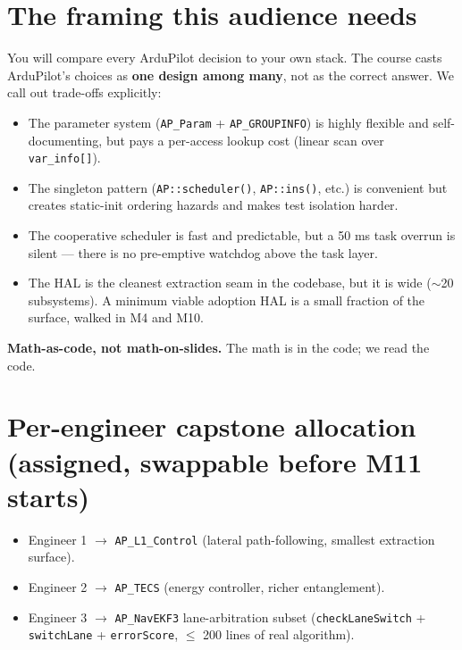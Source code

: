 \documentclass[a4paper,11pt,twoside]{article}
\begin{document}
\section*{The framing this audience needs}

You will compare every ArduPilot decision to your own stack. The course casts ArduPilot's choices as \textbf{one design among many}, not as the correct answer. We call out trade-offs explicitly:

\begin{itemize}
  \item The parameter system (\texttt{AP\_Param} + \texttt{AP\_GROUPINFO}) is highly flexible and self-documenting, but pays a per-access lookup cost (linear scan over \texttt{var\_info[]}).
  \item The singleton pattern (\texttt{AP::scheduler()}, \texttt{AP::ins()}, etc.) is convenient but creates static-init ordering hazards and makes test isolation harder.
  \item The cooperative scheduler is fast and predictable, but a 50 ms task overrun is silent --- there is no pre-emptive watchdog above the task layer.
  \item The HAL is the cleanest extraction seam in the codebase, but it is wide ($\sim$20 subsystems). A minimum viable adoption HAL is a small fraction of the surface, walked in M4 and M10.
\end{itemize}

\textbf{Math-as-code, not math-on-slides.} The math is in the code; we read the code.

\section*{Per-engineer capstone allocation (assigned, swappable before M11 starts)}
\begin{itemize}
  \item Engineer 1 $\rightarrow$ \texttt{AP\_L1\_Control} (lateral path-following, smallest extraction surface).
  \item Engineer 2 $\rightarrow$ \texttt{AP\_TECS} (energy controller, richer entanglement).
  \item Engineer 3 $\rightarrow$ \texttt{AP\_NavEKF3} lane-arbitration subset (\texttt{checkLaneSwitch} + \texttt{switchLane} + \texttt{errorScore}, $\leq$ 200 lines of real algorithm).
\end{itemize}
\end{document}
